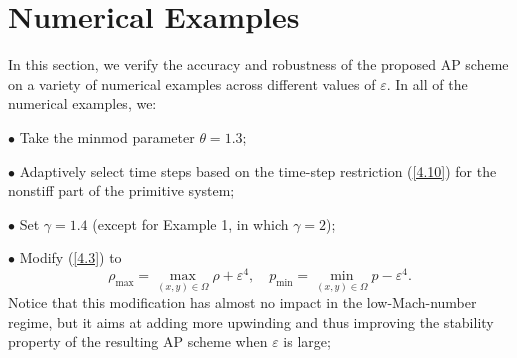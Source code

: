 \documentclass[preprint,12pt]{elsarticle}
\newcommand{\ve}{\varepsilon}
\newcommand\eref[1]{(\ref{#1})}
\begin{document}
\section{Numerical Examples}\label{sec6}
In this section, we verify the accuracy and robustness of the proposed AP scheme on a variety of numerical examples across different values 
of $\ve$. In all of the numerical examples, we:

\smallskip
\noindent
$\bullet$ Take the minmod parameter $\theta=1.3$;

\smallskip
\noindent
$\bullet$ Adaptively select time steps based on the time-step restriction \eref{4.10} for the nonstiff part of the primitive system;

\smallskip
\noindent
$\bullet$ Set $\gamma=1.4$ (except for Example 1, in which $\gamma=2$);

\smallskip
\noindent
$\bullet$ Modify \eref{4.3} to
\begin{equation}
	\rho_{\max}=\max\limits_{(x,y)\in\Omega}\rho+\ve^4,\quad p_{\min}=\min\limits_{(x,y)\in\Omega}p-\ve^4.
	\label{4.9}
\end{equation}
Notice that this modification has almost no impact in the low-Mach-number regime, but it aims at adding more upwinding and thus improving
the stability property of the resulting AP scheme when $\ve$ is large;
\end{document}
